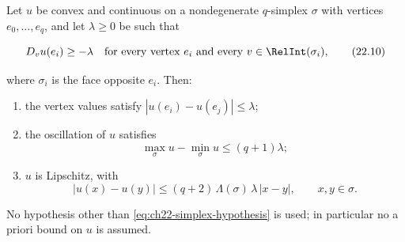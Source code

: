 \begin{lemma}
\label{lem:ch22-simplex}
Let $u$ be convex and continuous on a nondegenerate $q$-simplex
$\sigma$ with vertices $e_0,\ldots,e_q$, and let $\lambda\geq0$ be
such that

\[
 D_vu(e_i)\geq-\lambda
 \quad\text{for every vertex }e_i\text{ and every }
 v\in\RelInt(\sigma_i),
\tag{22.10}\label{eq:ch22-simplex-hypothesis}
\]

where $\sigma_i$ is the face opposite $e_i$.  Then:
\begin{enumerate}
\item\label{itm:ch22-simplex:vertices} the vertex values satisfy
$|u(e_i)-u(e_j)|\leq\lambda$;
\item\label{itm:ch22-simplex:osc} the oscillation of $u$ satisfies
\[
 \max_\sigma u-\min_\sigma u\leq(q+1)\lambda;
\tag{22.11}\label{eq:ch22-simplex-oscillation}
\]
\item\label{itm:ch22-simplex:lip} $u$ is Lipschitz, with
\[
 |u(x)-u(y)|\leq(q+2)\,\Lambda(\sigma)\,\lambda\,|x-y|,
 \qquad x,y\in\sigma .
\tag{22.12}\label{eq:ch22-simplex-lipschitz}
\]
\end{enumerate}
No hypothesis other than \eqref{eq:ch22-simplex-hypothesis} is used; in
particular no a priori bound on $u$ is assumed.
\end{lemma}

